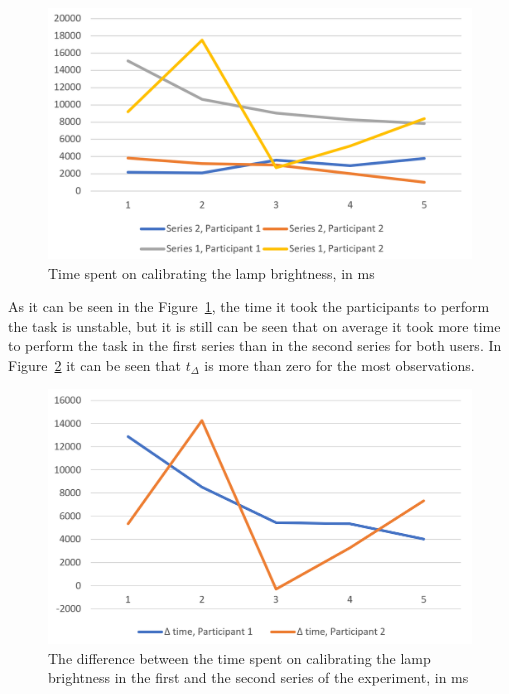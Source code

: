 \begin{figure}
  \centering
  \includegraphics[width = 0.9 \linewidth]{figures/ExperimentTime.png}
  \caption{Time spent on calibrating the lamp brightness, in ms}
  \label{fig:ExperimentTime-figure}
\end{figure}

As it can be seen in the Figure~\ref{fig:ExperimentTime-figure}, the time it took the participants to perform the task is unstable, but it is still can be seen that on average it took more time to perform the task in the first series than in the second series for both users. In Figure~\ref{fig:DeltaTime-figure} it can be seen that $t_{\Delta}$ is more than zero for the most observations.

\begin{figure}
  \centering
  \includegraphics[width = 0.9 \linewidth]{figures/DeltaTime.png}
  \caption{The difference between the time spent on calibrating the lamp brightness in the first and the second series of the experiment, in ms}
  \label{fig:DeltaTime-figure}
\end{figure}

